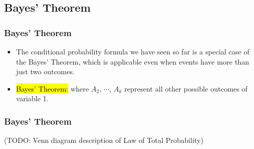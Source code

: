 \documentclass[slidestop,compress,mathserif]{beamer}
\makeatletter
\newcommand{\soln}[1]{\textit{#1}}
\newcommand{\solnGr}[1]{#1}
\def\chp3@path{../../Chp 3}
\makeatother
\begin{document}





\subsection{Bayes' Theorem}


\begin{frame}
\frametitle{Bayes' Theorem}

\begin{itemize}

\item The conditional probability formula we have seen so far is a special case of the Bayes' Theorem, which is applicable even when events have more than just two outcomes.

\pause 

\item \hl{Bayes' Theorem:}
where $A_2$, $\cdots$, $A_k$ represent all other possible outcomes of variable 1.

\end{itemize}

\end{frame}


\begin{frame}
\frametitle{Bayes' Theorem}

(TODO: Venn diagram description of Law of Total Probability)

\end{frame}
\end{document}
